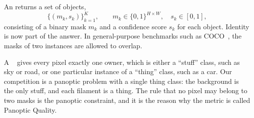 An  returns a set of objects,
\begin{equation}
\{(m_k, s_k)\}_{k=1}^{K}, \qquad m_k \in \{0,1\}^{H\times W}, \quad s_k \in [0,1],
\label{eq:par-instance}
\end{equation}
consisting of a binary mask $m_k$ and a confidence score $s_k$ for each object. Identity is now
part of the answer. In general-purpose benchmarks such as COCO~\citep{coco}, the masks of two
instances are allowed to overlap.

A ~\citep{pq} gives every pixel exactly one owner, which is either
a ``stuff'' class, such as sky or road, or one particular instance of a ``thing'' class, such as a
car. Our competition is a panoptic problem with a single thing class: the background is the only
stuff, and each filament is a thing. The rule that no pixel may belong to two masks is the panoptic
constraint, and it is the reason why the metric is called Panoptic Quality.

